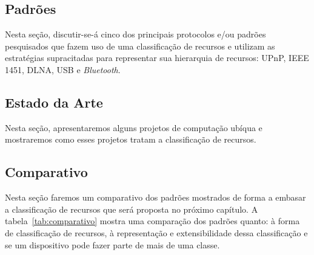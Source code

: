 \begin{comment}
Dessa forma, temos uma base de conhecimento. As Ontologias se tornaram populares na Web por dividir produtos em categorias e em características em sites de venda, e atualmente são utilizadas para compartilhar informação entre pessoas e agentes inteligentes. Uma antologia provê reutilização de conhecimento e torna explícitas as hipóteses sobre um domínio e análise do domínio.
\end{comment}


\subsection{Padrões}

Nesta seção, discutir-se-á cinco dos principais protocolos e/ou padrões pesquisados que fazem uso de uma classificação de recursos e utilizam as estratégias supracitadas para representar sua hierarquia de recursos: UPnP, IEEE 1451, DLNA, USB e \emph{Bluetooth}.








\subsection{Estado da Arte}
Nesta seção, apresentaremos alguns projetos de computação ubíqua e mostraremos como esses projetos tratam a classificação de recursos.





\subsection{Comparativo}
Nesta seção faremos um comparativo dos padrões mostrados de forma a embasar a classificação de recursos que será proposta no próximo capítulo. A tabela~\ref{tab:comparativo} mostra uma comparação dos padrões quanto: à forma de classificação de recursos, à representação e extensibilidade dessa classificação e se um dispositivo pode fazer parte de mais de uma classe.


